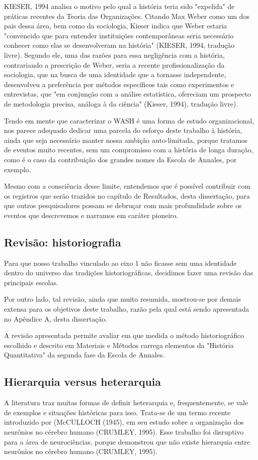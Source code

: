 KIESER, 1994  analisa o motivo pelo qual a história teria sido "expelida" de práticas recentes da Teoria das Organizações. Citando Max Weber como um dos pais dessa área, bem como da sociologia, Kieser indica que Weber estaria "convencido que para entender instituições contemporâneas seria necessário conhecer como elas se desenvolveram na história"  (KIESER, 1994, tradução livre). Segundo ele, uma das razões para essa negligência com a história, contrariando a prescrição de Weber, seria a recente profissionalização da sociologia, que na busca de uma identidade que a tornasse independente, desenvolveu a preferência por métodos específicos tais como experimentos e entrevistas, que "em conjunção com a análise estatística, ofereciam um prospecto de metodologia precisa, análoga à da ciência" (Kieser, 1994), tradução livre).

Tendo em mente que caracterizar o WASH é uma forma de estudo organizacional, nos parece adequado dedicar uma parcela do esforço deste trabalho à história, ainda que seja necessário manter nossa ambição auto-limitada, porque tratamos de eventos muito recentes, sem um compromisso com a história de longa duração, como é o caso da contribuição dos grandes nomes da Escola de Annales, por exemplo.

Mesmo com a consciência desse limite, entendemos que é possível contribuir com os registros que serão trazidos no capítulo de Resultados, desta dissertação, para que outros pesquisadores possam se debruçar com mais profundidade sobre os eventos que descrevemos e narramos em caráter pioneiro.

\subsection[Revisão: historiografia]{Revisão: historiografia}\label{Revisão: historiografia}
Para que nosso trabalho vinculado ao eixo 1 não ficasse sem uma identidade dentro do universo das tradições historiográficas, decidimos fazer uma revisão das principais escolas.

Por outro lado, tal revisão, ainda que muito resumida, mostrou-se por demais extensa para os objetivos deste trabalho, razão pela qual está sendo apresentada no Apêndice A, desta dissertação.

A revisão apresentada permite avaliar em que medida o método historiográfico escolhido e descrito em Materiais e Métodos carrega elementos da "História Quantitativa" da segunda fase da Escola de Annales.

\subsection[Hierarquia versus heterarquia]{Hierarquia versus heterarquia}\label{Hierarquia versus heterarquia}
A literatura traz muitas formas de definir heterarquia e, frequentemente, se vale de exemplos e situações históricas para isso. Trata-se de um termo  recente introduzido  por (McCULLOCH (1945), em seu estudo sobre a organização dos neurônios no cérebro humano (CRUMLEY, 1995). Esse trabalho foi disruptivo para a área de neurociências, porque demonstrou que não existe hierarquia entre neurônios no cérebro humano  (CRUMLEY, 1995).

